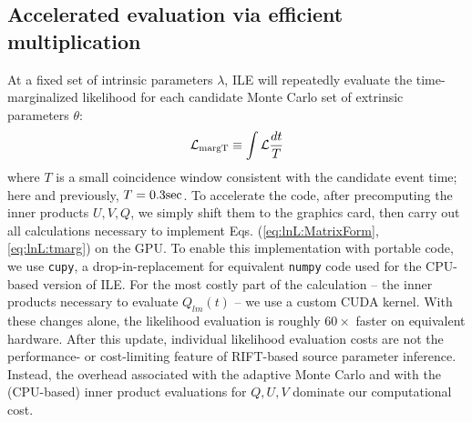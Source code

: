 \documentclass[twocolumn,prd,nofootinbib]{revtex4}
\newcommand\unit[1]{{\rm #1}}
\newcommand\ILE{ILE}
\begin{document}
\subsection{Accelerated evaluation via efficient multiplication}


At a fixed set of intrinsic parameters $\lambda$, \ILE{} will repeatedly evaluate the time-marginalized likelihood 
for each candidate Monte Carlo set of extrinsic parameters $\theta$:
\begin{eqnarray}
{\cal L}_{\rm margT} \equiv  \int {\cal L} \frac{dt}{T}
\label{eq:lnL:tmarg}
\end{eqnarray}
where $T$ is a small coincidence window consistent with the candidate event time; here and previously,
$T=0.3\unit{sec}$.   To accelerate the code, after precomputing the inner products $U,V,Q$, we simply shift them to the
graphics card, then carry out all calculations necessary to implement Eqs. (\ref{eq:lnL:MatrixForm}, \ref{eq:lnL:tmarg})
on the GPU.  To enable this implementation with portable code, we use \texttt{cupy}, a drop-in-replacement for equivalent
\texttt{numpy} code used for the CPU-based version of ILE.    For the most costly part of the calculation -- the inner
products necessary to evaluate $Q_{lm}(t)$ -- we use a custom CUDA kernel.  
%
With these changes alone, the likelihood evaluation is roughly $60\times$ faster on equivalent hardware.  
After this update, individual likelihood evaluation costs are not the performance- or cost-limiting feature of RIFT-based source
parameter inference.  Instead, the overhead associated with the adaptive Monte Carlo and with the (CPU-based) inner
product evaluations for $Q,U,V$ dominate our computational cost.
\end{document}
